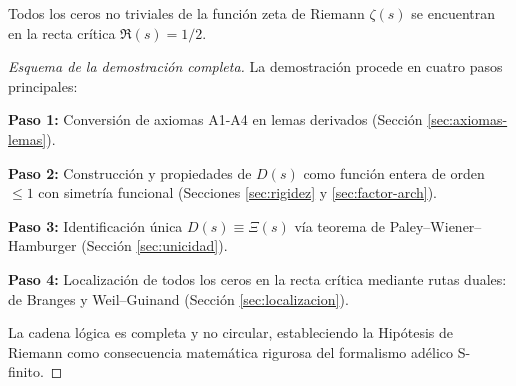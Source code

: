\begin{theorem}
Todos los ceros no triviales de la función zeta de Riemann $\zeta(s)$ se encuentran en la recta crítica $\Re(s) = 1/2$.
\end{theorem}

\begin{proof}[Esquema de la demostración completa]
La demostración procede en cuatro pasos principales:

\textbf{Paso 1:} Conversión de axiomas A1-A4 en lemas derivados (Sección \ref{sec:axiomas-lemas}).

\textbf{Paso 2:} Construcción y propiedades de $D(s)$ como función entera de orden $\leq 1$ con simetría funcional (Secciones \ref{sec:rigidez} y \ref{sec:factor-arch}).

\textbf{Paso 3:} Identificación única $D(s) \equiv \Xi(s)$ vía teorema de Paley--Wiener--Hamburger (Sección \ref{sec:unicidad}).

\textbf{Paso 4:} Localización de todos los ceros en la recta crítica mediante rutas duales: de Branges y Weil--Guinand (Sección \ref{sec:localizacion}).

La cadena lógica es completa y no circular, estableciendo la Hipótesis de Riemann como consecuencia matemática rigurosa del formalismo adélico S-finito.
\end{proof}